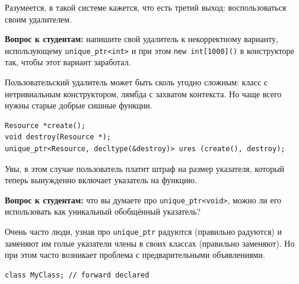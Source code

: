 \documentclass[a4paper,12pt,oneside]{article}
\newif\ifanswers
\begin{document}
Разумеется, в такой системе кажется, что есть третий выход: воспользоваться своим удалителем.

\textbf{Вопрос к студентам:} напишите свой удалитель к некорректному варианту, использующему \lstinline!unique_ptr<int>! и при этом \lstinline!new int[1000]()! в конструкторе так, чтобы этот вариант заработал.

\ifanswers
Правильный ответ: например так

\begin{lstlisting}
template <typename T> struct MyArrDeleter {
  void operator()(T *t) { delete [] t; }
};

unique_ptr<int, MyArrDeleter<int>> ui3 (new int[1000]());
\end{lstlisting}

Но хороший студент напишет через лямбду
\fi

Пользовательский удалитель может быть сколь угодно сложным: класс с нетривиальным конструктором, лямбда с захватом контекста. Но чаще всего нужны старые добрые сишные функции.

\begin{lstlisting}
Resource *create();
void destroy(Resource *);
unique_ptr<Resource, decltype(&destroy)> ures (create(), destroy);
\end{lstlisting}

Увы, в этом случае пользователь платит штраф на размер указателя, который теперь вынужденно включает указатель на функцию.

\textbf{Вопрос к студентам:} что вы думаете про \lstinline!unique_ptr<void>!, можно ли его использовать как уникальный обобщённый указатель?

\ifanswers
Проблемы, как водится, будут с удалением. Работать может примерно такая городушка:

\begin{lstlisting}
template <typename T>
struct VDel {
  void operator()(void *s) { delete static_cast<T*>(s); }
};
unique_ptr<void, VDel<int>> u(new int(42));
\end{lstlisting}
\fi

Очень часто люди, узнав про \lstinline!unique_ptr! радуются (правильно радуются) и заменяют им голые указатели члены в своих классах (правильно заменяют). Но при этом часто возникает проблема с предварительными объявлениями.

\begin{lstlisting}
class MyClass; // forward declared
\end{lstlisting}
\end{document}
